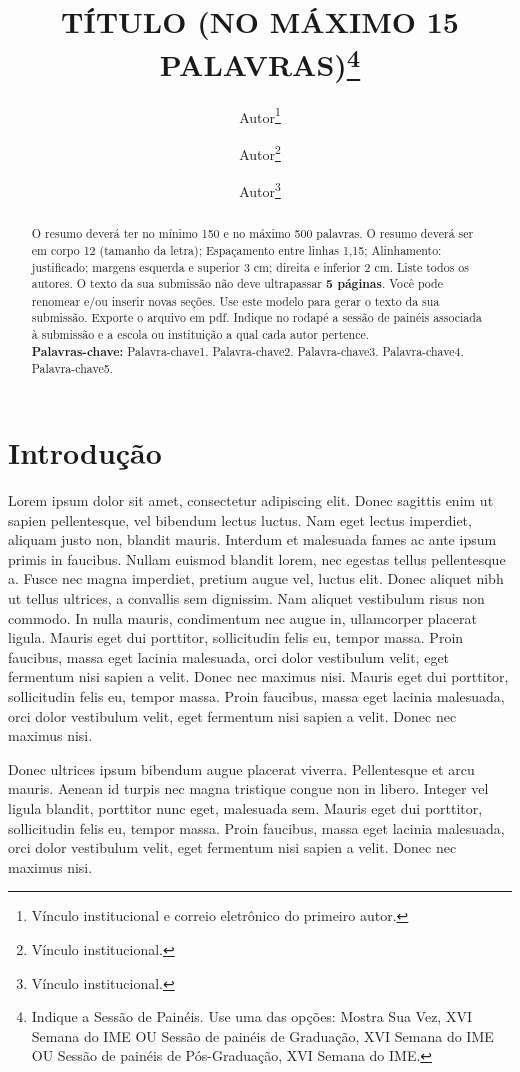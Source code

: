 \documentclass[12pt]{article}
\title{\textbf{TÍTULO (NO MÁXIMO 15 PALAVRAS)}\thanks{Indique a Sessão de Painéis. Use uma das opções:  Mostra Sua Vez, XVI Semana do IME OU  Sessão de painéis de Graduação, XVI Semana do IME OU  Sessão de painéis de Pós-Graduação, XVI Semana do IME.}}
\author{Autor\thanks{Vínculo institucional e correio eletrônico do primeiro autor.}\and Autor\thanks{Vínculo institucional.} \and Autor\thanks{Vínculo institucional.}}
\date{ }
\begin{document}
\thispagestyle{empty}
\maketitle
\begin{abstract}
O resumo deverá ter no mínimo 150 e no máximo 500 palavras. O resumo deverá ser em corpo 12 (tamanho da letra); Espaçamento entre linhas 1,15; Alinhamento:  justificado; margens esquerda e superior 3 cm; direita e inferior 2 cm.  Liste todos os autores. O texto da sua submissão não deve ultrapassar \textbf{5 páginas}. Você pode renomear e/ou inserir novas seções. Use este modelo para gerar o texto da sua submissão. Exporte o arquivo em pdf. Indique no rodapé a sessão de painéis associada à submissão e a escola ou instituição a qual cada autor pertence.\\

\noindent\textbf{Palavras-chave:} Palavra-chave1. Palavra-chave2. Palavra-chave3. Palavra-chave4. Palavra-chave5.
\end{abstract}


\section*{Introdução}

Lorem ipsum dolor sit amet, consectetur adipiscing elit. Donec sagittis enim ut sapien pellentesque, vel bibendum lectus luctus. Nam eget lectus imperdiet, aliquam justo non, blandit mauris. Interdum et malesuada fames ac ante ipsum primis in faucibus. Nullam euismod blandit lorem, nec egestas tellus pellentesque a. Fusce nec magna imperdiet, pretium augue vel, luctus elit. Donec aliquet nibh ut tellus ultrices, a convallis sem dignissim. Nam aliquet vestibulum risus non commodo. In nulla mauris, condimentum nec augue in, ullamcorper placerat ligula. Mauris eget dui porttitor, sollicitudin felis eu, tempor massa. Proin faucibus, massa eget lacinia malesuada, orci dolor vestibulum velit, eget fermentum nisi sapien a velit. Donec nec maximus nisi. Mauris eget dui porttitor, sollicitudin felis eu, tempor massa. Proin faucibus, massa eget lacinia malesuada, orci dolor vestibulum velit, eget fermentum nisi sapien a velit. Donec nec maximus nisi.

	Donec ultrices ipsum bibendum augue placerat viverra. Pellentesque et arcu mauris. Aenean id turpis nec magna tristique congue non in libero. Integer vel ligula blandit, porttitor nunc eget, malesuada sem. Mauris eget dui porttitor, sollicitudin felis eu, tempor massa. Proin faucibus, massa eget lacinia malesuada, orci dolor vestibulum velit, eget fermentum nisi sapien a velit. Donec nec maximus nisi.
\end{document}
